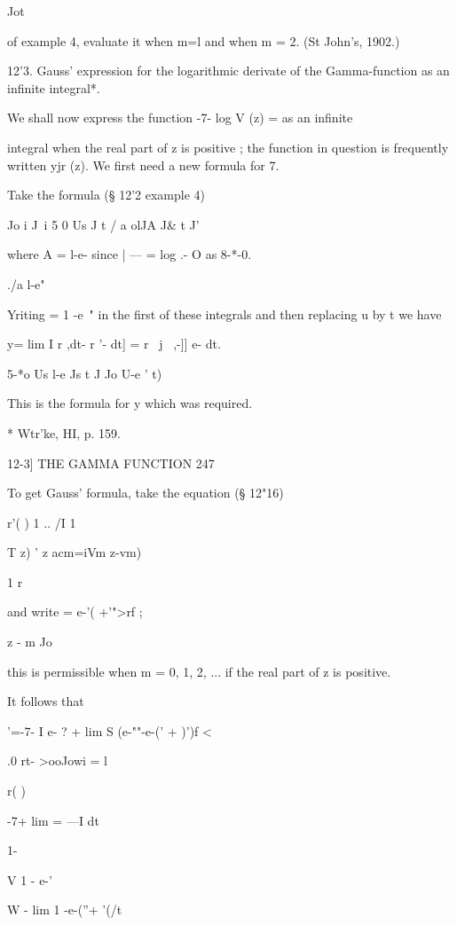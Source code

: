 Jot

of example 4, evaluate it when m=l and when m = 2. (St John's, 1902.)



12'3. Gauss' expression for the logarithmic derivate of the
Gamma-function as an infinite integral*.

We shall now express the function -7- log V (z) = as an infinite

integral when the real part of z is positive ; the function in
question is frequently written yjr (z). We first need a new formula
for 7.

Take the formula (§ 12'2 example 4)

  Jo i J\ i 5 0 Us J t / a olJA J\& t J'

where A = l-e- since | — = log .- O as 8-*-0.

./a l-e"

 Yriting = 1 -e~" in the first of these integrals and then replacing u
by t we have

y= lim I r ,dt- r '- dt] = r \ j~ ,-]] e- dt.

5-*o Us l-e Js t J Jo U-e ' t)

This is the formula for y which was required.

* Wtr'ke, HI, p. 159.



12-3] THE GAMMA FUNCTION 247

To get Gauss' formula, take the equation (§ 12"16)

r'( ) 1 .. /I 1 \

T z) ' z acm=iVm z-vm)

1 r

and write = e-'( +'">rf ;

z - m Jo

this is permissible when m = 0, 1, 2, ... if the real part of z is
positive.

It follows that

 '=-7- I e- ? + lim S (e-""-e-(' + )')f <

.0 rt- >ooJowi = l



r( )



-7+ lim = —I dt



1-

V 1 - e-'



W - lim 1 -e-(''+ '(/t



